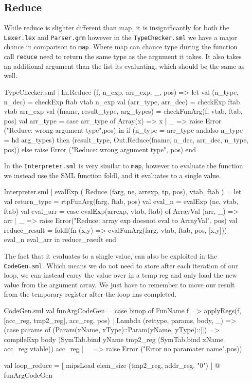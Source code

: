\documentclass[11pt,a4paper,oneside]{report}
\begin{document}
\subsection*{Reduce}
While reduce is slighter different than map, it is insignificantly for both the \texttt{Lexer.lex} and \texttt{Parser.grm} however in the \texttt{TypeChecker.sml} we have a major chance in comparison to \texttt{map}. Where map can chance type during the function call \texttt{reduce} need to return the same type as the argument it takes. It also takes an additional argument than the list its evaluating, which should be the same as well.
\begin{code}[firstnumber=253]{TypeChecker.sml}
| In.Reduce (f, n_exp, arr_exp, _, pos)
      =>
      let val (n_type, n_dec) = checkExp ftab vtab n_exp
          val (arr_type, arr_dec) = checkExp ftab vtab arr_exp
          val (fname, result_type, arg_types) = checkFunArg(f, vtab, ftab, pos)
          val arr_type = case arr_type of
                      Array(x) => x
                    | _ => raise Error ("Reduce: wrong argument type",pos)
      in
          if (n_type = arr_type andalso n_type = hd arg_types)
          then (result_type, Out.Reduce(fname, n_dec, arr_dec, n_type, pos))
          else raise Error ("Reduce: wrong argument type", pos)
      end
\end{code}

In the \texttt{Interpreter.sml} is very similar to \texttt{map}, however to evaluate the function we instead use the SML function foldl, and it evaluates to a single value.
\begin{code}[firstnumber=305]{Interpreter.sml}
  | evalExp ( Reduce (farg, ne, arrexp, tp, pos), vtab, ftab ) =
    let
      val return_type = rtpFunArg(farg, ftab, pos)
      val eval_n = evalExp (ne, vtab, ftab)
      val eval_arr = case evalExp(arrexp, vtab, ftab) of
          ArrayVal (arr, _) => arr
        | _ => raise Error("Reduce: array exp doesnot eval to ArrayVal", pos)
      val reduce_result = foldl(fn (x,y) => evalFunArg(farg, vtab, ftab, pos, [x,y])) eval_n eval_arr
    in
      reduce_result
    end
\end{code}

The fact that it evaluates to a single value, can also be exploited in the \texttt{CodeGen.sml}. Which means we do not need to store after each iteration of our loop, we can instead carry the value over in a temp reg and only load the new value from the argument array. We just have to remember to move our result from the temporary register after the loop has completed.
\begin{code}[firstnumber=662]{CodeGen.sml}
val funArgCodeGen = case binop of
              FunName f => applyRegs(f, [acc_reg, tmp2_reg], acc_reg, pos)
            | Lambda (rettype, params, body, _) => (case params of
                   (Param(xName, xType)::Param(yName, yType)::[]) =>
                          compileExp body (SymTab.bind yName tmp2_reg (SymTab.bind xName acc_reg vtable)) acc_reg
                 | _ => raise Error ("Error no paramater name",pos))

val loop_reduce = [ mipsLoad elem_size (tmp2_reg, addr_reg, "0") ]
                  @ funArgCodeGen
\end{code}
\end{document}
